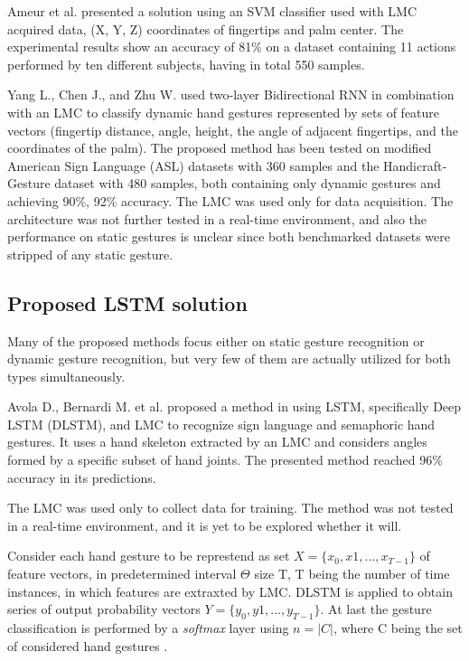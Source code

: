 Ameur et al. \cite{ameur} presented a solution using an SVM classifier used with LMC acquired data, (X, Y, Z) coordinates of fingertips and palm center. The experimental results show an accuracy of 81\% on a dataset containing 11 actions performed by ten different subjects, having in total 550 samples.

Yang L., Chen J., and Zhu W. \cite{bidirect_dynam} used two-layer Bidirectional RNN in combination with an LMC to classify dynamic hand gestures represented by sets of feature vectors (fingertip distance, angle, height, the angle of adjacent fingertips, and the coordinates of the palm). The proposed method has been tested on modified American Sign Language (ASL) datasets with 360 samples and the Handicraft‐Gesture dataset with 480 samples, both containing only dynamic gestures and achieving 90\%, 92\% accuracy. The LMC was used only for data acquisition. The architecture was not further tested in a real-time environment, and also the performance on static gestures is unclear since both benchmarked datasets were stripped of any static gesture. \cite{bidirect_dynam}

\subsection{Proposed LSTM solution}

Many of the proposed methods focus either on static gesture recognition or dynamic gesture recognition, but very few of them are actually utilized for both types simultaneously. 

Avola D., Bernardi M. et al. proposed a method in \cite{avola} using LSTM, specifically Deep LSTM (DLSTM), and LMC to recognize sign language and semaphoric hand gestures. It uses a hand skeleton extracted by an LMC and considers angles formed by a specific subset of hand joints. The presented method reached 96\% accuracy in its predictions.

The LMC was used only to collect data for training. The method was not tested in a real-time environment, and it is yet to be explored whether it will.

Consider each hand gesture to be represtend as set $X = \{x_0, x1, ..., x_{T-1}\}$ of feature vectors, in predetermined interval $\Theta$ size T, T being the number of time instances, in which features are extraxted by LMC. DLSTM is applied to obtain series of output probability vectors $Y = \{y_0, y1, ..., y_{T-1}\}$. At last the gesture classification is performed by a \textit{softmax} layer using $n = |C|$, where C being the set of considered hand gestures \cite{avola}.

